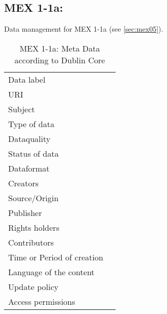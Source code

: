 \subsection{MEX 1-1a:}
Data management for MEX 1-1a (see \ref{sec:mex05}).

\begin{table}[!ht]
\caption{MEX 1-1a: Meta Data according to Dublin Core}
\label{tab:dms-mex1-1a}
\small
\begin{tabular}{R{3cm}|L{7cm}}
\hline
%
Data label &  \\
URI &  \\
Subject  &  \\
Type of data  &  \\
Dataquality  &  \\
Status of data  &  \\
Dataformat  & \\
Creators  &  \\
Source/Origin &  \\
Publisher  &  \\
Rights holders &  \\
Contributors &  \\
Time or Period of creation &  \\
Language of the content &  \\
Update policy &  \\
Access permissions &  \\
%
\hline
\end{tabular}
\end{table}